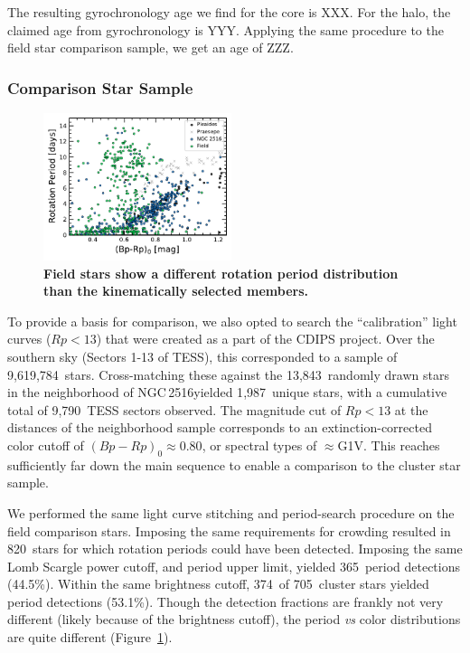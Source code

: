 \documentclass[12pt,twocolumn,tighten]{aastex63}
\newcommand{\cn}{NGC\,2516} %
\newcommand{\ncalibration}{9{,}619{,}784\ } %
\newcommand{\nnbhd}{13{,}843\ } %
\newcommand{\nnbhdcaliblc}{9{,}790\ } %
\newcommand{\nnbhdcalibstar}{1{,}987\ } %
\newcommand{\ncompstardenominator}{820\ } %
\newcommand{\ncompstarnumerator}{365\ } %
\newcommand{\ncompfrac}{44.5\%} %
\newcommand{\nautovscompstardenominator}{705\ } %
\newcommand{\nautovscompstarnumerator}{374\ } %
\newcommand{\nautofrac}{53.1\%} %
\begin{document}
The resulting gyrochronology age we find for the core is XXX.
For the halo, the claimed age from gyrochronology is YYY.
Applying the same procedure to the field star comparison sample,
we get an age of ZZZ.

\subsubsection{Comparison Star Sample}

\begin{figure}[t]
	\begin{center}
		\leavevmode
    \includegraphics[width=0.49\textwidth]{f9.pdf}
	\end{center}
	\vspace{-0.7cm}
	\caption{ {\bf Field stars show a different rotation period
  distribution than the kinematically selected members.}
		\label{fig:compstar}
	}
\end{figure}

To provide a basis for comparison, we also opted to search the
``calibration'' light curves ($Rp<13$) that were created as a part of
the CDIPS project.  Over the southern sky (Sectors 1-13 of TESS), this
corresponded to a sample of \ncalibration stars.  Cross-matching these
against the \nnbhd randomly drawn stars in the neighborhood of \cn yielded
\nnbhdcalibstar unique stars, with a cumulative total of \nnbhdcaliblc TESS
sectors observed.
The magnitude cut of $Rp<13$ at the distances of the neighborhood sample
corresponds to an extinction-corrected color cutoff of $(Bp-Rp)_0
\approx 0.80$, or spectral types of $\approx$G1V.
This reaches sufficiently far down the main sequence to enable a
comparison to the cluster star sample.

We performed the same light curve stitching and period-search
procedure on the field comparison stars.
Imposing the same requirements for crowding resulted in
\ncompstardenominator stars for which rotation periods could have been
detected.
Imposing the same Lomb Scargle power cutoff, and period upper limit,
yielded \ncompstarnumerator period detections (\ncompfrac).
Within the same brightness cutoff, 
\nautovscompstarnumerator of \nautovscompstardenominator cluster stars
yielded period detections (\nautofrac).
Though the detection fractions are frankly not very different
(likely because of the brightness cutoff), the period {\it
vs} color distributions are quite different
(Figure~\ref{fig:compstar}).
\end{document}
